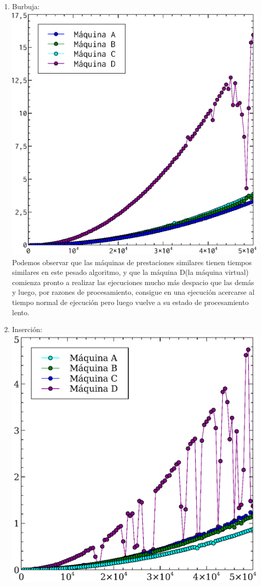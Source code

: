 \documentclass[a4paper, 11pt]{article}
\begin{document}
\begin{enumerate}
  \item Burbuja:\\
  \includegraphics[scale=0.5]{burbuja_todos.eps}\\
  Podemos observar que las máquinas de prestaciones similares tienen tiempos similares en este pesado algoritmo, y que la máquina D(la máquina virtual) comienza pronto a realizar las ejecuciones mucho más despacio que las demás y luego, por razones de procesamiento, consigue en una ejecución acercarse al tiempo normal de ejecución pero luego vuelve a su estado de procesamiento lento.
  \item Inserción:\\
  \includegraphics[scale=0.5]{insercion_todos.eps}\\

\end{enumerate}
\end{document}
